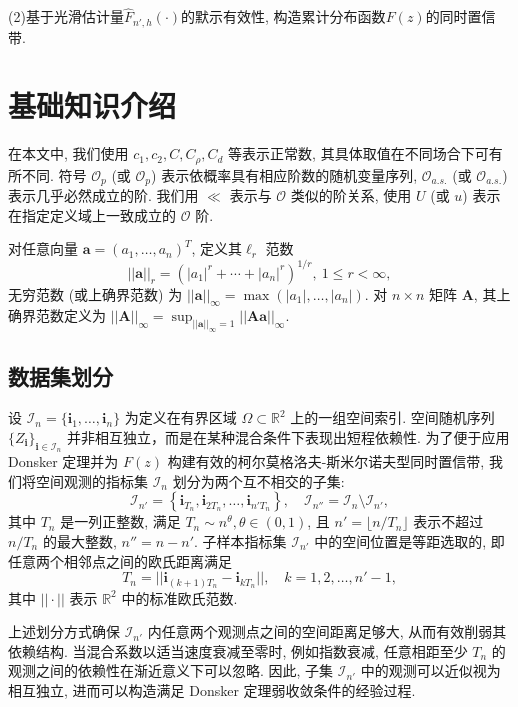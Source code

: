 \documentclass[a4paper,openay,14pt]{ctexbook}
\numberwithin{equation}{section}
\numberwithin{lem}{section}
\newcommand{\chapterwithfancyheader}[1]{  
    \chapter{#1} %
    \thispagestyle{fancy} %
}
\begin{document}
(2)基于光滑估计量$\hat{F}_{n',h}(\cdot)$的默示有效性, 构造累计分布函数$F(z)$的同时置信带.


\chapterwithfancyheader{基础知识介绍}\label{SEC: Preliminary}

在本文中, 我们使用 $c_1, c_2, C, C_\rho, C_d$ 等表示正常数, 其具体取值在不同场合下可有所不同.
符号 $\mathcal{O}_p$ (或 $\scriptstyle{\mathcal{O}}_p$) 表示依概率具有相应阶数的随机变量序列,  $\mathcal{O}_{a.s.}$ (或 $\scriptstyle{\mathcal{O}}_{a.s.}$) 表示几乎必然成立的阶.
我们用 $\ll$ 表示与 $\mathcal{O}$ 类似的阶关系, 使用 $U$ (或 $u$) 表示在指定定义域上一致成立的 $\mathcal{O}$ 阶.

对任意向量 $\mathbf{a} = \left(a_1, \ldots, a_n\right)^T$, 定义其$\ell_r$ 范数
$$||\mathbf{a}||_r = \left( |a_1|^r + \cdots + |a_n|^r \right)^{1/r},\ 1 \leq r < \infty,$$
无穷范数 (或上确界范数) 为
\(
||\mathbf{a}||_{\infty} = \max \left( |a_1|, \ldots, |a_n| \right).
\)
对 $n \times n$ 矩阵 $\mathbf{A}$, 其上确界范数定义为
\(||\mathbf{A}||_{\infty} = \sup_{||\mathbf{a}||_{\infty} = 1} ||\mathbf{A}\mathbf{a}||_{\infty}.\)

\section{数据集划分}
设 \(\mathcal{I}_n = \{\mathbf{i}_1, \ldots, \mathbf{i}_n\}\) 为定义在有界区域 \(\Omega \subset \mathbb{R}^2\) 上的一组空间索引. 空间随机序列 $\{Z_{\mathbf{i}}\}_{\mathbf{i} \in \mathcal{I}_n}$ 并非相互独立，而是在某种混合条件下表现出短程依赖性. 为了便于应用 Donsker 定理并为 $F(z)$ 构建有效的柯尔莫格洛夫-斯米尔诺夫型同时置信带, 我们将空间观测的指标集 $\mathcal{I}_n$ 划分为两个互不相交的子集:
\[
\mathcal{I}_{n'} = \left\{ \mathbf{i}_{T_n}, \mathbf{i}_{2T_n}, \ldots, \mathbf{i}_{n' T_n} \right\}, 
\quad 
\mathcal{I}_{n''} = \mathcal{I}_n \setminus \mathcal{I}_{n'},
\]
其中 $T_n$ 是一列正整数, 满足 $T_n \sim n^{\theta}, \theta \in (0,1)$, 且 $n' = \lfloor n / T_n \rfloor$ 表示不超过 $n/T_n$ 的最大整数, $n'' = n - n'$. 子样本指标集 $\mathcal{I}_{n'}$ 中的空间位置是等距选取的, 即任意两个相邻点之间的欧氏距离满足
\[
T_n = ||\mathbf{i}_{(k+1)T_n} - \mathbf{i}_{kT_n}||, \quad k = 1,2,\dots,n'-1,
\]
其中 $||\cdot||$ 表示 $\mathbb{R}^2$ 中的标准欧氏范数.

上述划分方式确保 $\mathcal{I}_{n'}$ 内任意两个观测点之间的空间距离足够大, 从而有效削弱其依赖结构. 当混合系数以适当速度衰减至零时, 例如指数衰减, 任意相距至少 $T_n$ 的观测之间的依赖性在渐近意义下可以忽略. 因此, 子集 $\mathcal{I}_{n'}$ 中的观测可以近似视为相互独立, 进而可以构造满足 Donsker 定理弱收敛条件的经验过程.
\end{document}
